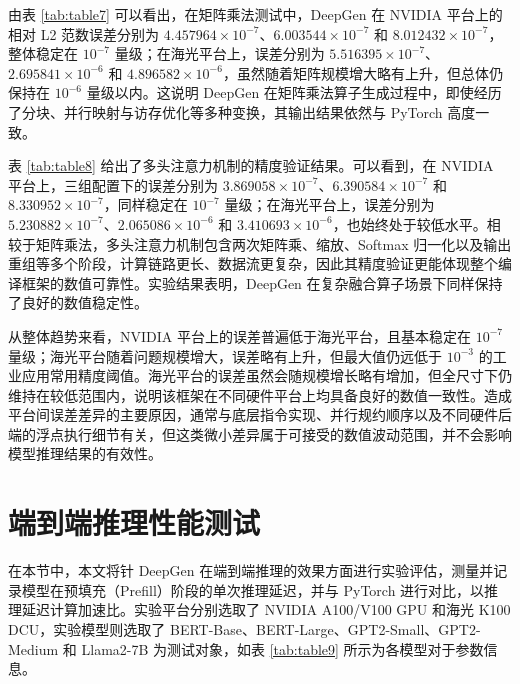 由表 \ref{tab:table7} 可以看出，在矩阵乘法测试中，DeepGen 在 NVIDIA 平台上的相对 L2 范数误差分别为 $4.457964\times 10^{-7}$、$6.003544\times 10^{-7}$ 和 $8.012432\times 10^{-7}$，整体稳定在 $10^{-7}$ 量级；在海光平台上，误差分别为 $5.516395\times 10^{-7}$、$2.695841\times 10^{-6}$ 和 $4.896582\times 10^{-6}$，虽然随着矩阵规模增大略有上升，但总体仍保持在 $10^{-6}$ 量级以内。这说明 DeepGen 在矩阵乘法算子生成过程中，即使经历了分块、并行映射与访存优化等多种变换，其输出结果依然与 PyTorch 高度一致。

表 \ref{tab:table8} 给出了多头注意力机制的精度验证结果。可以看到，在 NVIDIA 平台上，三组配置下的误差分别为 $3.869058\times 10^{-7}$、$6.390584\times 10^{-7}$ 和 $8.330952\times 10^{-7}$，同样稳定在 $10^{-7}$ 量级；在海光平台上，误差分别为 $5.230882\times 10^{-7}$、$2.065086\times 10^{-6}$ 和 $3.410693\times 10^{-6}$，也始终处于较低水平。相较于矩阵乘法，多头注意力机制包含两次矩阵乘、缩放、Softmax 归一化以及输出重组等多个阶段，计算链路更长、数据流更复杂，因此其精度验证更能体现整个编译框架的数值可靠性。实验结果表明，DeepGen 在复杂融合算子场景下同样保持了良好的数值稳定性。

从整体趋势来看，NVIDIA 平台上的误差普遍低于海光平台，且基本稳定在 $10^{-7}$ 量级；海光平台随着问题规模增大，误差略有上升，但最大值仍远低于 $10^{-3}$ 的工业应用常用精度阈值。海光平台的误差虽然会随规模增长略有增加，但全尺寸下仍维持在较低范围内，说明该框架在不同硬件平台上均具备良好的数值一致性。造成平台间误差差异的主要原因，通常与底层指令实现、并行规约顺序以及不同硬件后端的浮点执行细节有关，但这类微小差异属于可接受的数值波动范围，并不会影响模型推理结果的有效性。

\section{端到端推理性能测试}

在本节中，本文将针 DeepGen 在端到端推理的效果方面进行实验评估，测量并记录模型在预填充（Prefill）阶段的单次推理延迟，并与 PyTorch 进行对比，以推理延迟计算加速比。实验平台分别选取了 NVIDIA A100/V100 GPU 和海光 K100 DCU，实验模型则选取了 BERT-Base、BERT-Large、GPT2-Small、GPT2-Medium 和 Llama2-7B 为测试对象，如表 \ref{tab:table9} 所示为各模型对于参数信息。

